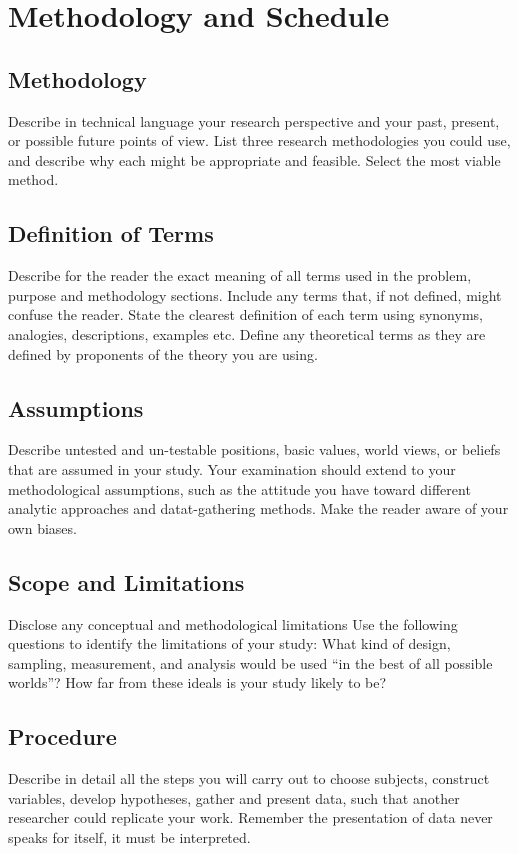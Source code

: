 \chapter{Methodology and Schedule} 
\section{Methodology}
Describe in technical language your research perspective and your past, present, or possible future points of view.
List three research methodologies you could use, and describe why each might be appropriate and feasible. Select the most viable method.

\section{Definition of Terms}
Describe for the reader the exact meaning of all terms used in the problem, purpose and methodology sections. Include any terms that, if not defined, might confuse the reader.
State the clearest definition of each term using synonyms, analogies, descriptions, examples etc. Define any theoretical terms as they are defined by proponents of the theory you are using.

\section{Assumptions}
Describe untested and un-testable positions, basic values, world views, or beliefs that are assumed in your study.
Your examination should extend to your methodological assumptions, such as the attitude you have toward different analytic approaches and datat-gathering methods. Make the reader aware of your own biases.

\section{Scope and Limitations}
Disclose any conceptual and methodological limitations
Use the following questions to identify the limitations of your study: What kind of design, sampling, measurement, and analysis would be used “in the best of all possible worlds”? How far from these ideals is your study likely to be?

\section{Procedure}
Describe in detail all the steps you will carry out to choose subjects, construct variables, develop hypotheses, gather and present data, such that another researcher could replicate your work.
Remember the presentation of data never speaks for itself, it must be interpreted.

